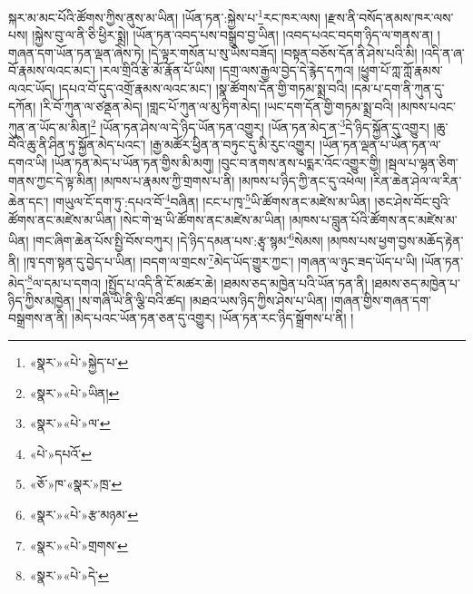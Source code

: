 སྐར་མ་མང་པོའི་ཚོགས་ཀྱིས་ནུས་མ་ཡིན། །ཡོན་ཏན་:སྐྱེས་པ་\footnote{«སྣར་»«པེ་»སྐྱེད་པ་}རང་ཁར་ལས། །རྫས་ནི་བསོད་ནམས་ཁར་ལས་པས། །སྐྱེས་བུ་ལ་ནི་ཅི་ཕྱིར་སྨྲེ། །ཡོན་ཏན་འབད་པས་བསྒྲུབ་བྱ་ཡིན། །འབད་པའང་བདག་ཉིད་ལ་གནས་ན། །གཞན་དག་ཡོན་ཏན་ལྡན་ཞེས་ཏེ། །དེ་ལྟར་གསོན་པ་སུ་ཡིས་བཟོད། །བསྟན་བཅོས་དོན་ནི་ཤེས་པའི་མི། །འདི་ན་ཞ་བོ་རྣམས་ལའང་མང་། །རལ་གྲིའི་རྩེ་མོ་རྣོན་པོ་ཡིས། །དགྲ་ལས་རྒྱལ་བྱེད་དེ་རྙེད་དཀའ། །ཕྱུག་པོ་ཀླ་ཀློ་རྣམས་ལའང་ཡོད། །དཔའ་བོ་དུད་འགྲོ་རྣམས་ལའང་མང་། །སྣ་ཚོགས་དོན་གྱི་གཏམ་སྨྲ་བའི། །དམ་པ་དག་ནི་ཀུན་དུ་དཀོན། །རི་བོ་ཀུན་ལ་ཙནྡན་མེད། །གླང་པོ་ཀུན་ལ་མུ་ཏིག་མེད། །ཡང་དག་དོན་གྱི་གཏམ་སྨྲ་བའི། །མཁས་པའང་ཀུན་ན་ཡོད་མ་མིན།\footnote{«སྣར་»«པེ་»ཡིན།} །ཡོན་ཏན་ཤེས་ལ་དེ་ཉིད་ཡོན་ཏན་འགྱུར། །ཡོན་ཏན་མེད་ན་\footnote{«སྣར་»«པེ་»ལ་}དེ་ཉིད་སྐྱོན་དུ་འགྱུར། །ཆུ་བོའི་ཆུ་ནི་ཤིན་ཏུ་སྐྱོན་མེད་པའང་། །རྒྱ་མཚོར་ཕྱིན་ན་བཏུང་དུ་མི་རུང་འགྱུར། །ཡོན་ཏན་ལྡན་པ་ཡོན་ཏན་ལ་དགའ་ཡི། །ཡོན་ཏན་མེད་པ་ཡོན་ཏན་གྱིས་མི་མགུ། །བུང་བ་ནགས་ནས་པདྨར་འོང་འགྱུར་གྱི། །སྦལ་པ་ལྷན་ཅིག་གནས་ཀྱང་དེ་ལྟ་མིན། །མཁས་པ་རྣམས་ཀྱི་གྲགས་པ་ནི། །མཁས་པ་ཉིད་ཀྱི་ནང་དུ་འཕེལ། །རིན་ཆེན་ཤེལ་ལ་རིན་ཆེན་དང་། །གཡུལ་ངོ་དག་ཏུ་:དཔའ་བོ་\footnote{«པེ་»དཔའོ་}བཞིན། །ངང་པ་ཁྭ་\footnote{«ཅོ་»ཁ་«སྣར་»ཁྲ་}ཡི་ཚོགས་ནང་མཛེས་མ་ཡིན། །ཅང་ཤེས་བོང་བུའི་ཚོགས་ནང་མཛེས་མ་ཡིན། །སེང་གེ་ཝ་ཡི་ཚོགས་ནང་མཛེས་མ་ཡིན། །མཁས་པ་བླུན་པོའི་ཚོགས་ནང་མཛེས་མ་ཡིན། །གང་ཞིག་ཆེན་པོས་སྤྱི་བོས་བཀུར། །དེ་ཉིད་དམན་པས་:རྩྭ་སྙམ་\footnote{«སྣར་»«པེ་»རྩ་མཉམ་}སེམས། །མཁས་པས་ཕྱག་བྱས་མཆོད་རྟེན་ནི། །ཁྭ་དག་སྟན་དུ་བྱེད་པ་ཡིན། །བདག་ལ་གྲངས་\footnote{«སྣར་»«པེ་»གྲགས་}མེད་ཡོད་གྱུར་ཀྱང་། །གཞན་ལ་ཉུང་ཟད་ཡོད་པ་ཡི། །ཡོན་ཏན་མེད་\footnote{«སྣར་»«པེ་»དེ་}ལ་དམ་པ་དགའ། །སྤྱོད་པ་འདི་ནི་ངོ་མཚར་ཆེ། །ཐམས་ཅད་མཁྱེན་པའི་ཡོན་ཏན་ནི། །ཐམས་ཅད་མཁྱེན་པ་ཉིད་ཀྱིས་མཁྱེན། །ས་གཞི་ཡི་ནི་ལྕི་བའི་ཚད། །མཐའ་ཡས་ཉིད་ཀྱིས་ཤེས་པ་ཡིན། །གཞན་གྱིས་གཞན་དག་བསྒྲགས་ན་ནི། །མེད་པའང་ཡོན་ཏན་ཅན་དུ་འགྱུར། །ཡོན་ཏན་རང་ཉིད་སྒྲོགས་པ་ནི། །
